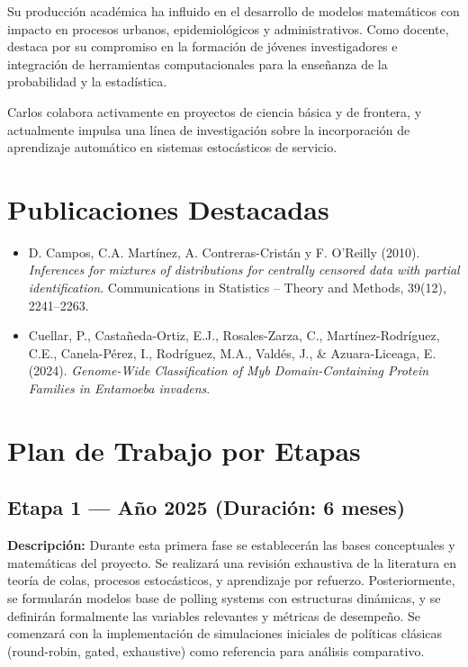\documentclass[12pt]{article}
\begin{document}
Su producción académica ha influido en el desarrollo de modelos matemáticos con impacto en procesos urbanos, epidemiológicos y administrativos. Como docente, destaca por su compromiso en la formación de jóvenes investigadores e integración de herramientas computacionales para la enseñanza de la probabilidad y la estadística.

Carlos colabora activamente en proyectos de ciencia básica y de frontera, y actualmente impulsa una línea de investigación sobre la incorporación de aprendizaje automático en sistemas estocásticos de servicio.

\section{Publicaciones Destacadas}
\begin{itemize}
  \item D. Campos, C.A. Martínez, A. Contreras-Cristán y F. O'Reilly (2010). \textit{Inferences for mixtures of distributions for centrally censored data with partial identification}. Communications in Statistics -- Theory and Methods, 39(12), 2241--2263.
  \item Cuellar, P., Castañeda-Ortiz, E.J., Rosales-Zarza, C., Martínez-Rodríguez, C.E., Canela-Pérez, I., Rodríguez, M.A., Valdés, J., \& Azuara-Liceaga, E. (2024). \textit{Genome-Wide Classification of Myb Domain-Containing Protein Families in Entamoeba invadens}.
\end{itemize}


\section{Plan de Trabajo por Etapas}

\subsection*{Etapa 1 — Año 2025 (Duración: 6 meses)}
\textbf{Descripción:} Durante esta primera fase se establecerán las bases conceptuales y matemáticas del proyecto. Se realizará una revisión exhaustiva de la literatura en teoría de colas, procesos estocásticos, y aprendizaje por refuerzo. Posteriormente, se formularán modelos base de polling systems con estructuras dinámicas, y se definirán formalmente las variables relevantes y métricas de desempeño. Se comenzará con la implementación de simulaciones iniciales de políticas clásicas (round-robin, gated, exhaustive) como referencia para análisis comparativo.
\end{document}
